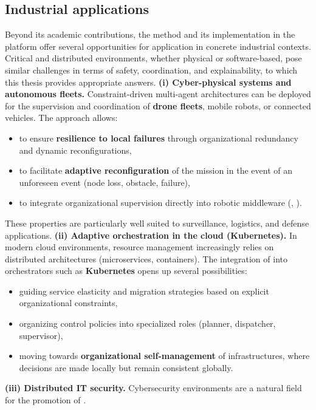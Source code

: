 \subsection*{Industrial applications}
Beyond its academic contributions, the  method and its implementation in the  platform offer several opportunities for application in concrete industrial contexts.
Critical and distributed environments, whether physical or software-based, pose similar challenges in terms of safety, coordination, and explainability, to which this thesis provides appropriate answers.
\medskip
\noindent
\textbf{(i) Cyber-physical systems and autonomous fleets.}
Constraint-driven multi-agent architectures can be deployed for the supervision and coordination of \textbf{drone fleets}, mobile robots, or connected vehicles.
The  approach allows:
\begin{itemize}
  \item to ensure \textbf{resilience to local failures} through organizational redundancy and dynamic reconfigurations,
  \item to facilitate \textbf{adaptive reconfiguration} of the mission in the event of an unforeseen event (node loss, obstacle, failure),

  \item to integrate organizational supervision directly into robotic middleware (, ).
\end{itemize}
These properties are particularly well suited to surveillance, logistics, and defense applications.
\medskip
\noindent
\textbf{(ii) Adaptive orchestration in the cloud (Kubernetes).}
In modern cloud environments, resource management increasingly relies on distributed architectures (microservices, containers).
The integration of  into orchestrators such as \textbf{Kubernetes} opens up several possibilities:
\begin{itemize}

  \item guiding service elasticity and migration strategies based on explicit organizational constraints,
  \item organizing control policies into specialized roles (planner, dispatcher, supervisor),
  \item moving towards \textbf{organizational self-management} of infrastructures, where decisions are made locally but remain consistent globally.
\end{itemize}
\medskip
\noindent
\textbf{(iii) Distributed IT security.}
Cybersecurity environments are a natural field for the promotion of .
